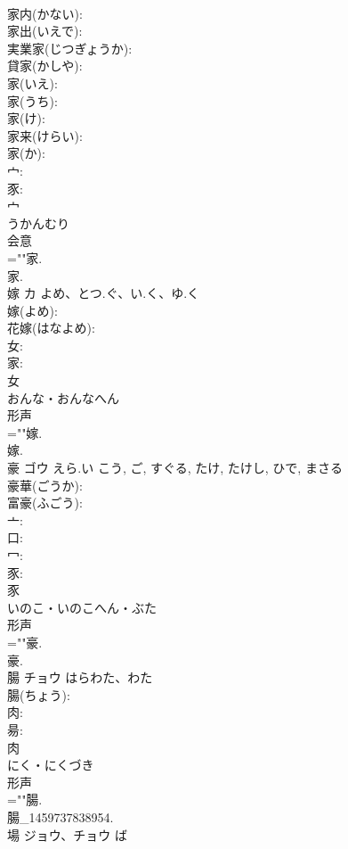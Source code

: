\documentclass[8pt]{extreport}
\begin{document}
\begin{CJK}{UTF8}{min}
\\	家内(かない): 
\\	家出(いえで): 
\\	実業家(じつぎょうか): 
\\	貸家(かしや): 
\\	家(いえ): 
\\	家(うち): 
\\	家(け): 
\\	家来(けらい): 
\\	家(か): 
\\	宀: 
\\	豕: 
\\	宀	
\\	うかんむり	
\\	会意 
\\	=""家.
\\	家.
\\	嫁	カ	よめ、とつ.ぐ、い.く、ゆ.く		
\\	嫁(よめ): 
\\	花嫁(はなよめ): 
\\	女: 
\\	家: 
\\	女	
\\	おんな・おんなへん	
\\	形声 
\\	=""嫁.
\\	嫁.
\\	豪	ゴウ	えら.い	こう, ご, すぐる, たけ, たけし, ひで, まさる	
\\	豪華(ごうか): 
\\	富豪(ふごう): 
\\	亠: 
\\	口: 
\\	冖: 
\\	豕: 
\\	豕	
\\	いのこ・いのこへん・ぶた	
\\	形声 
\\	=""豪.
\\	豪.
\\	腸	チョウ	はらわた、わた		
\\	腸(ちょう): 
\\	肉: 
\\	昜: 
\\	肉	
\\	にく・にくづき	
\\	形声 
\\	=""腸.
\\	腸_1459737838954.
\\	場	ジョウ、チョウ	ば		

\end{CJK}
\end{document}
